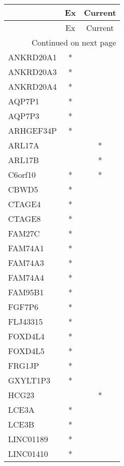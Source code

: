 \begin{longtable}{lcc}
\toprule
{} & Ex & Current \\
\midrule
\endfirsthead

\toprule
{} & Ex & Current \\
\midrule
\endhead
\midrule
\multicolumn{3}{r}{{Continued on next page}} \\
\midrule
\endfoot

\bottomrule
\endlastfoot
ANKRD20A1          &  * &         \\
ANKRD20A3          &  * &         \\
ANKRD20A4          &  * &         \\
AQP7P1             &  * &         \\
AQP7P3             &  * &         \\
ARHGEF34P          &  * &         \\
ARL17A             &    &       * \\
ARL17B             &    &       * \\
C6orf10            &  * &       * \\
CBWD5              &  * &         \\
CTAGE4             &  * &         \\
CTAGE8             &  * &         \\
FAM27C             &  * &         \\
FAM74A1            &  * &         \\
FAM74A3            &  * &         \\
FAM74A4            &  * &         \\
FAM95B1            &  * &         \\
FGF7P6             &  * &         \\
FLJ43315           &  * &         \\
FOXD4L4            &  * &         \\
FOXD4L5            &  * &         \\
FRG1JP             &  * &         \\
GXYLT1P3           &  * &         \\
HCG23              &    &       * \\
LCE3A              &  * &         \\
LCE3B              &  * &         \\
LINC01189          &  * &         \\
LINC01410          &  * &         \\

\end{longtable}
